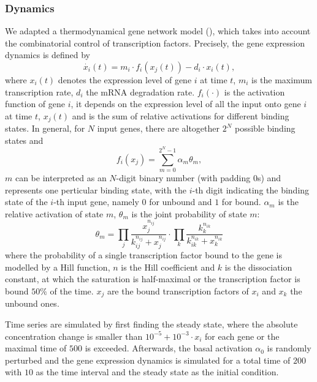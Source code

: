 \subsubsection{Dynamics}
We adapted a thermodynamical gene network model 
(\citealp{Schilstra2002,Marbach2010,Schaffter2011}),
which takes into account the combinatorial control of transcription factors. 
Precisely, the 
gene expression dynamics is defined by 
\begin{equation}
  \dot{x_i}(t) = m_i \cdot f_i(x_j(t)) - d_i \cdot x_i(t), 
\label{eq:gnw_model}
\end{equation}
where $x_i(t)$ denotes the expression level of gene $i$ at time $t$, 
$m_i$ is the 
maximum transcription rate, $d_i$ the mRNA degradation rate. $f_i(\cdot)$
is the activation function of gene $i$, it depends on the expression level of 
all the input onto gene $i$ at time $t$, $x_j(t)$ and is the sum of relative 
activations for
different binding states. In general, for $N$ input genes, there are altogether
$2^N$ possible binding states and
\begin{equation}
  \displaystyle f_i(x_j) = \sum_{m=0}^{2^N-1} \alpha_m \theta_m,
\end{equation}
$m$ can be interpreted as an $N$-digit binary number (with padding $0$s) 
and represents one perticular binding state, with the $i$-th
digit indicating the binding state of the $i$-th input gene, namely $0$ for unbound
and $1$ for bound. $\alpha_m$ is the relative activation of state $m$,
$\theta_m$ is the joint probability of state $m$: 
\begin{equation}
  \theta_{m} = \prod_j \frac{x_j^{n_{ij}}}{k_{ij}^{n_{ij}}+x_j^{n_{ij}}}
    \cdot \prod_k \frac{k_k^{n_{ik}}}{k_{ik}^{n_{ik}}+x_k^{n_{ik}}}
\end{equation}
where the probability of a single transcription factor bound to the gene is 
modelled by a Hill function,
$n$ is the Hill coefficient and $k$ is the dissociation constant, at which the
saturation is half-maximal or the transcription factor is bound $50\%$ of the time.
$x_j$ are the bound transcription factors of $x_i$ and $x_k$ the unbound ones.

Time series are simulated by first finding the steady state, where the absolute
concentration change is smaller than $10^{-5} + 10^{-3} \cdot x_i$ for each gene
or the maximal time of $500$ is exceeded. Afterwards, the basal activation $\alpha_0$
is randomly perturbed and the gene expression dynamics is simulated for a total
time of $200$ with $10$ as the time interval and the
steady state as the initial condition.

